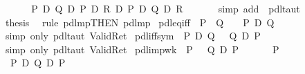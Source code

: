 \begin{isabellebody}
\isamarkupfalse%
\ {\isacharminus}\isanewline
\ \ \isamarkupfalse%
\ {\isachardoublequote}{\isasymturnstile}\ {\isacharparenleft}P\ {\isasymlongrightarrow}\isactrlsub D\ Q{\isacharparenright}\ {\isasymlongrightarrow}\isactrlsub D\ {\isacharparenleft}P\ {\isasymlongrightarrow}\isactrlsub D\ R{\isacharparenright}\ {\isasymlongrightarrow}\isactrlsub D\ {\isacharparenleft}P\ {\isasymlongrightarrow}\isactrlsub D\ Q\ {\isasymand}\isactrlsub D\ R{\isacharparenright}{\isachardoublequote}\ \isanewline
\ \ \ \ \isamarkupfalse%
\ {\isacharparenleft}simp\ add{\isacharcolon}\ \ pdl{\isacharunderscore}taut{\isacharparenright}\isanewline
\ \ \isamarkupfalse%
\ {\isacharquery}thesis\ \isamarkupfalse%
\ {\isacharparenleft}rule\ pdl{\isacharunderscore}mp{\isacharbrackleft}THEN\ pdl{\isacharunderscore}mp{\isacharbrackright}{\isacharparenright}\isanewline
\isamarkupfalse%
\isanewline
\isanewline
\isamarkupfalse%
\ pdl{\isacharunderscore}eq{\isacharunderscore}iff{\isacharcolon}\ {\isachardoublequote}{\isasymlbrakk}\ P\ {\isacharequal}\ Q\ {\isasymrbrakk}\ {\isasymLongrightarrow}\ {\isasymturnstile}\ P\ {\isasymlongleftrightarrow}\isactrlsub D\ Q{\isachardoublequote}\isanewline
\isamarkupfalse%
\ {\isacharparenleft}simp\ only{\isacharcolon}\ pdl{\isacharunderscore}taut\ Valid{\isacharunderscore}Ret{\isacharparenright}\isanewline
\isanewline
\isanewline
\isamarkupfalse%
\ pdl{\isacharunderscore}iff{\isacharunderscore}sym{\isacharcolon}\ {\isachardoublequote}{\isasymturnstile}\ P\ {\isasymlongleftrightarrow}\isactrlsub D\ Q\ {\isasymLongrightarrow}\ {\isasymturnstile}\ Q\ {\isasymlongleftrightarrow}\isactrlsub D\ P{\isachardoublequote}\isanewline
\isamarkupfalse%
\ {\isacharparenleft}simp\ only{\isacharcolon}\ pdl{\isacharunderscore}taut\ Valid{\isacharunderscore}Ret{\isacharparenright}\isanewline
\isanewline
\isamarkupfalse%
\ pdl{\isacharunderscore}imp{\isacharunderscore}wk{\isacharcolon}\ {\isachardoublequote}{\isasymturnstile}\ P\ {\isasymLongrightarrow}\ {\isasymturnstile}\ Q\ {\isasymlongrightarrow}\isactrlsub D\ P{\isachardoublequote}\isanewline
\isamarkupfalse%
\ {\isacharminus}\isanewline
\ \ \isamarkupfalse%
\ {\isachardoublequote}{\isasymturnstile}\ P{\isachardoublequote}\isanewline
\ \ \isamarkupfalse%
\ {\isachardoublequote}{\isasymturnstile}\ P\ {\isasymlongrightarrow}\isactrlsub D\ Q\ {\isasymlongrightarrow}\isactrlsub D\ P{\isachardoublequote}\ \isamarkupfalse%

\end{isabellebody}
